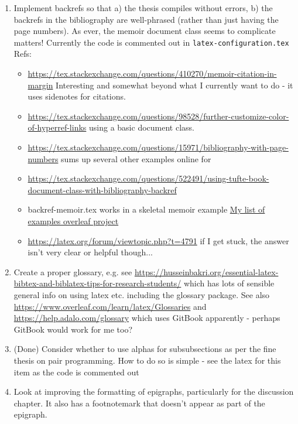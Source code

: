 \begin{enumerate}
    \item Implement backrefs so that a) the thesis compiles without errors, b) the backrefs in the bibliography are well-phrased (rather than just having the page numbers). As ever, the memoir document class seems to complicate matters! Currently the code is commented out in \texttt{latex-configuration.tex} Refs:
    \begin{itemize}
        \item \url{https://tex.stackexchange.com/questions/410270/memoir-citation-in-margin} Interesting and somewhat beyond what I currently want to do - it uses sidenotes for citations.
        \item \url{https://tex.stackexchange.com/questions/98528/further-customize-color-of-hyperref-links} using a basic document class.
        \item \url{https://tex.stackexchange.com/questions/15971/bibliography-with-page-numbers} sums up several other examples online for
        \item \url{https://tex.stackexchange.com/questions/522491/using-tufte-book-document-class-with-bibliography-backref}
        \item backref-memoir.tex works in a skeletal memoir example \href{https://www.overleaf.com/project/612fb5e6f6cc44c10b56afa1}{My list of examples overleaf project}
        \item \url{https://latex.org/forum/viewtopic.php?t=4791} if I get stuck, the answer isn't very clear or helpful though...
    \end{itemize}

    \item Create a proper glossary, e.g. see \url{https://husseinbakri.org/essential-latex-bibtex-and-biblatex-tips-for-research-students/} which has lots of sensible general info on using latex etc. including the glossary package. See also \url{https://www.overleaf.com/learn/latex/Glossaries} and \url{https://help.adalo.com/glossary} which uses GitBook apparently - perhaps GitBook would work for me too?

    \item (Done) Consider whether to use alphas for subsubsections as per the fine thesis on pair programming. How to do so is simple - see the latex for this item as the code is commented out %

    \item Look at improving the formatting of epigraphs, particularly for the discussion chapter. It also has a footnotemark that doesn't appear as part of the epigraph.


\end{enumerate}
